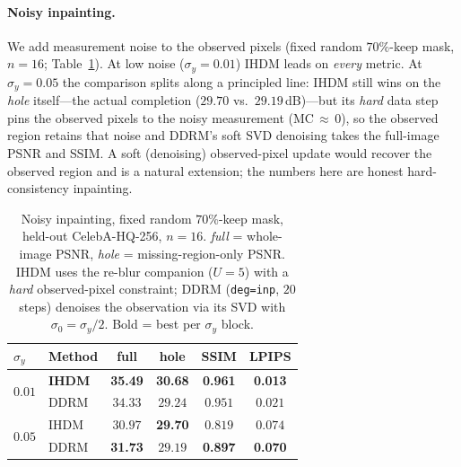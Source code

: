 \documentclass[11pt]{article}
\begin{document}
\paragraph{Noisy inpainting.}
We add measurement noise to the observed pixels (fixed random $70\%$-keep mask, $n{=}16$;
Table~\ref{tab:inpaintnoise}). At low noise ($\sigma_y{=}0.01$) IHDM leads on \emph{every} metric. At
$\sigma_y{=}0.05$ the comparison splits along a principled line: IHDM still wins on the \emph{hole}
itself---the actual completion ($29.70$ vs.\ $29.19$\,dB)---but its \emph{hard} data step pins the
observed pixels to the noisy measurement (MC$\,\approx\,0$), so the observed region retains that
noise and DDRM's soft SVD denoising takes the full-image PSNR and SSIM. A soft (denoising)
observed-pixel update would recover the observed region and is a natural extension; the numbers here
are honest hard-consistency inpainting.

\begin{table}[h]
\centering
\caption{Noisy inpainting, fixed random $70\%$-keep mask, held-out CelebA-HQ-256, $n{=}16$.
\emph{full} = whole-image PSNR, \emph{hole} = missing-region-only PSNR. IHDM uses the re-blur
companion ($U{=}5$) with a \emph{hard} observed-pixel constraint; DDRM (\texttt{deg=inp}, $20$ steps)
denoises the observation via its SVD with $\sigma_0{=}\sigma_y/2$. Bold = best per $\sigma_y$ block.}
\label{tab:inpaintnoise}
\begin{tabular}{llcccc}
\toprule
$\sigma_y$ & Method & full & hole & SSIM & LPIPS \\
\midrule
\multirow{2}{*}{$0.01$}
 & \textbf{IHDM} & \textbf{35.49} & \textbf{30.68} & \textbf{0.961} & \textbf{0.013} \\
 & DDRM & $34.33$ & $29.24$ & $0.951$ & $0.021$ \\
\midrule
\multirow{2}{*}{$0.05$}
 & IHDM & $30.97$ & \textbf{29.70} & $0.819$ & $0.074$ \\
 & DDRM & \textbf{31.73} & $29.19$ & \textbf{0.897} & \textbf{0.070} \\
\bottomrule
\end{tabular}
\end{table}
\end{document}

